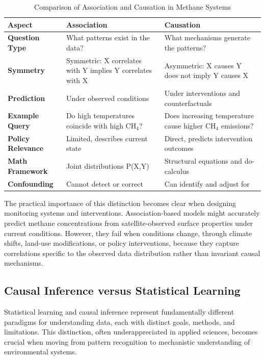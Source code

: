 \begin{table}[h!]
\centering
\caption{Comparison of Association and Causation in Methane Systems}
\label{tab:association_vs_causation}
\begin{tabular}{p{3cm}|p{6cm}|p{6cm}}
\hline
\textbf{Aspect} & \textbf{Association} & \textbf{Causation} \\
\hline
\textbf{Question Type} & What patterns exist in the data? & What mechanisms generate the patterns? \\
\textbf{Symmetry} & Symmetric: X correlates with Y implies Y correlates with X & Asymmetric: X causes Y does not imply Y causes X \\
\textbf{Prediction} & Under observed conditions & Under interventions and counterfactuals \\
\textbf{Example Query} & Do high temperatures coincide with high CH$_4$? & Does increasing temperature cause higher CH$_4$ emissions? \\
\textbf{Policy Relevance} & Limited, describes current state & Direct, predicts intervention outcomes \\
\textbf{Math Framework} & Joint distributions P(X,Y) & Structural equations and do-calculus \\
\textbf{Confounding} & Cannot detect or correct & Can identify and adjust for \\
\hline
\end{tabular}
\end{table}

The practical importance of this distinction becomes clear when designing monitoring systems and interventions. Association-based models might accurately predict methane concentrations from satellite-observed surface properties under current conditions. However, they fail when conditions change, through climate shifts, land-use modifications, or policy interventions, because they capture correlations specific to the observed data distribution rather than invariant causal mechanisms.

\subsection{Causal Inference versus Statistical Learning}

Statistical learning and causal inference represent fundamentally different paradigms for understanding data, each with distinct goals, methods, and limitations. This distinction, often underappreciated in applied sciences, becomes crucial when moving from pattern recognition to mechanistic understanding of environmental systems.

